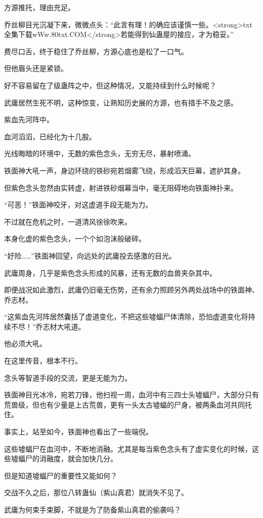 \begin{this_body}
方源推托，理由充足。

乔丝柳目光沉凝下来，微微点头：“此言有理！的确应该谨慎一些。<strong>txt全集下载wWw.80txt.COM</strong>若能得到仙蛊屋的接应，才为稳妥。”

费尽口舌，终于稳住了乔丝柳，方源心底也是松了一口气。

但他眉头还是紧锁。

好不容易留在了级蛊阵之中，但这种情况，又能持续到什么时候呢？

武庸居然生死不明，这种惊变，让熟知历史展的方源，也有措手不及之感。

紫血先河阵中。

血河滔滔，已经化为十几股。

光线晦暗的环境中，无数的紫色念头，无穷无尽，暴射喷涌。

铁面神大吼一声，身边环绕的铁砂宛若烟雾飞绕，形成滔天巨幕，遮护其身。

但紫色念头忽然由实转虚，射进铁砂烟幕当中，毫无阻碍地向铁面神扑来。

“可恶！”铁面神咬牙，对这虚道手段无能为力。

不过就在危机之时，一道清风徐徐吹来。

本身化虚的紫色念头，一个个如泡沫般破碎。

“好险……”铁面神回望，向远处的武庸投去感激的目光。

武庸周身，几乎是紫色念头形成的风暴，还有无数的血兽夹杂其中。

即便战况如此激烈，武庸仍旧毫无伤势，还有余力照顾另外两处战场中的铁面神、乔志材。

“这紫血先河阵居然囊括了虚道变化，不把这些墟蝠尸体清除，恐怕虚道变化将持续不尽！”乔志材大吼道。

他必须大吼。

在这里传音，根本不行。

念头等智道手段的交流，更是无能为力。

铁面神目光冰冷，宛若刀锋，他扫视一周，血河中有三四士头墟蝠尸，大部分只有荒兽级，但也有少量是上古荒兽，更有一头太古墟蝠的尸身，被两条血河共同托住。

事实上，站至如今，铁面神也看出了一些端倪。

这些墟蝠尸在血河中，不断地消融。尤其是每当紫色念头有了虚实变化的时候，这些墟蝠尸的消融度，就会加快几分。

但是知道墟蝠尸的重要性又能如何？

交战不久之后，那位八转蛊仙（紫山真君）就消失不见了。

武庸为何束手束脚，不就是为了防备紫山真君的偷袭吗？


\end{this_body}
